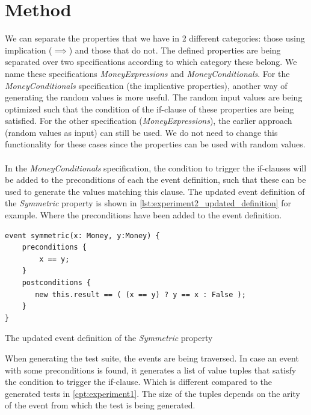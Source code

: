 \section{Method}
\label{sct:experiment2_method}
We can separate the properties that we have in 2 different categories: those
using implication ($\implies$) and those that do not. The defined properties are
being separated over two specifications according to which category these
belong. We name these specifications \textit{MoneyExpressions} and
\textit{MoneyConditionals}. For the \textit{MoneyConditionals} specification
(the implicative properties), another way of generating the random values is
more useful. The random input values are being optimized such that the condition
of the if-clause of these properties are being satisfied. For the other
specification (\textit{MoneyExpressions}), the earlier approach (random values
as input) can still be used. We do not need to change this functionality for
these cases since the properties can be used with random values.\\
\\
In the \textit{MoneyConditionals} specification, the condition to trigger the
if-clauses will be added to the preconditions of each the event definition, such
that these can be used to generate the values matching this clause. The updated
event definition of the \textit{Symmetric} property is shown in
\autoref{lst:experiment2_updated_definition} for example. Where the
preconditions have been added to the event definition.
\FloatBarrier
\begin{sourcecode}[!ht]
\begin{lstlisting}[language=Rebel]
event symmetric(x: Money, y:Money) {
    preconditions {
        x == y;
    }
    postconditions {
       new this.result == ( (x == y) ? y == x : False );
    }
}
\end{lstlisting}
\caption{The updated event definition of the \textit{Symmetric} property}
\label{lst:experiment2_updated_definition}
\end{sourcecode}
\FloatBarrier
When generating the test suite, the events are being traversed. In case an
event with some preconditions is found, it generates a list of value tuples that
satisfy the condition to trigger the if-clause. Which is different compared to
the generated tests in \autoref{cpt:experiment1}. The size of the tuples depends
on the arity of the event from which the test is being generated.\\
